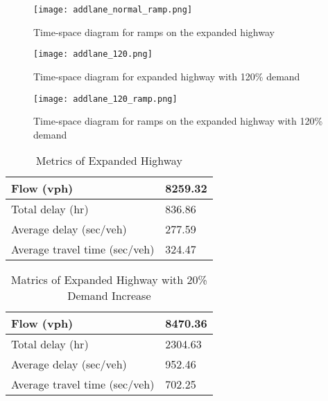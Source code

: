 \documentclass{article}
\begin{document}
\begin{figure}
    \centering
    \texttt{[image: addlane\_normal\_ramp.png]}
    \caption{Time-space diagram for ramps on the expanded highway}
    \label{fig:expansion_ramp}
\end{figure}

\begin{figure}
    \centering
    \texttt{[image: addlane\_120.png]}
    \caption{Time-space diagram for expanded highway with 120\% demand}
    \label{fig:expansion120}
\end{figure}

\begin{figure}
    \centering
    \texttt{[image: addlane\_120\_ramp.png]}
    \caption{Time-space diagram for ramps on the expanded highway with 120\% demand}
    \label{fig:expansion_ramp120}
\end{figure}

\begin{table}[]
\centering
\caption{Metrics of Expanded Highway}
\begin{tabular}{|l|l|}
\hline
Flow (vph)                    & 8259.32 \\ \hline
Total delay (hr)              & 836.86  \\ \hline
Average delay (sec/veh)       & 277.59  \\ \hline
Average travel time (sec/veh) & 324.47  \\ \hline
\end{tabular}
\label{expansion}
\end{table}

\begin{table}[]
\centering
\caption{Matrics of Expanded Highway with 20\% Demand Increase}
\begin{tabular}{|l|l|}
\hline
Flow (vph)                    & 8470.36 \\ \hline
Total delay (hr)              & 2304.63 \\ \hline
Average delay (sec/veh)       & 952.46  \\ \hline
Average travel time (sec/veh) & 702.25  \\ \hline
\end{tabular}
\label{expansion120}
\end{table}


\end{document}
